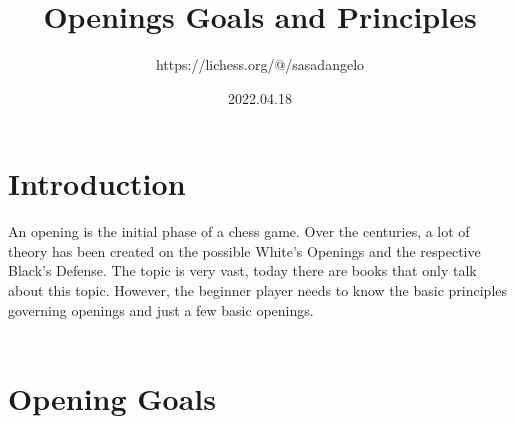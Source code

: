 \documentclass{article}
\title{Openings Goals and Principles}
\author{https://lichess.org/@/sasadangelo}
\date{2022.04.18}
\begin{document}
\begin{titlepage}
\maketitle
\end{titlepage}
\section{ Introduction}

An opening is the initial phase of a chess game. Over the centuries, a lot of theory has been created on the possible White's Openings and the respective Black's Defense. The topic is very vast, today there are books that only talk about this topic. However, the beginner player needs to know the basic principles governing openings and just a few basic openings.\\
\\
\section{ Opening Goals}
\end{document}
